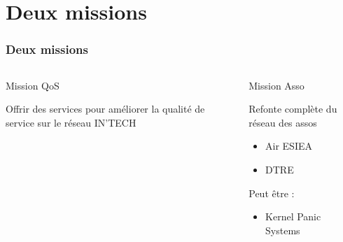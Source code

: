 \documentclass[9pt]{beamer}
\begin{document}
\section{Deux missions}
\begin{frame}
    \frametitle{Deux missions}
    \begin{columns}[T]
        \begin{column}{0.5\textwidth}
            \begin{block}{Mission QoS}
                \begin{center} 
                Offrir des services pour améliorer la qualité de service sur le réseau IN'TECH
                \end{center}
            \end{block}
        \end{column}
        \begin{column}{0.5\textwidth}
            \begin{block}{Mission Asso}
                \begin{center} 
                    Refonte complète du réseau des assos  \\
                    \begin{itemize}
                        \item{Air ESIEA}
                        \item{DTRE}
                    \end{itemize}
                    \begin{flushleft}
                        Peut être :
                    \end{flushleft}
                    \begin{itemize}
                        \item{Kernel Panic Systems}
                    \end{itemize}
                \end{center}
            \end{block}
        \end{column}
    \end{columns}
\end{frame}
\end{document}

